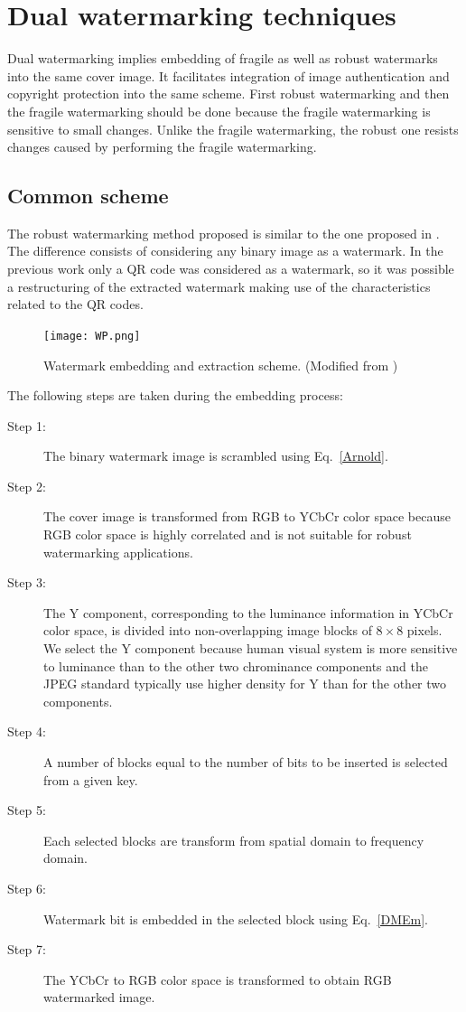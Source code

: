 \documentclass[runningheads]{llncs}
\begin{document}
\section{Dual watermarking techniques}
Dual watermarking implies embedding of fragile as well as robust watermarks into the same cover image. It facilitates integration of image authentication and copyright protection into the same scheme. First robust watermarking and then the fragile watermarking should be done because the fragile watermarking is sensitive to small changes. Unlike the fragile watermarking, the robust one resists changes caused by performing the fragile watermarking.

\subsection{Common scheme}
The robust watermarking method proposed is similar to the one proposed in \cite{avila2018watermarking}. The difference consists of considering any binary image as a watermark. In the previous work only a QR code was considered as a watermark, so it was possible a restructuring of the extracted watermark making use of the characteristics related to the QR codes.
\begin{figure}
	\begin{center}
		\texttt{[image: WP.png]}
	\end{center}
	\caption{Watermark embedding and extraction scheme. (Modified from \cite{avila2018watermarking})}
	\label{PIE}
\end{figure}

The following steps are taken during the embedding process:
\begin{description}
	\item[Step 1:] The binary watermark image is scrambled using Eq.~\ref{Arnold}.
	\item[Step 2:] The cover image is transformed from RGB to YCbCr color space because RGB color space is highly correlated and is not suitable for robust watermarking applications.
	\item[Step 3:] The Y component, corresponding to the luminance information in YCbCr color space, is divided into non-overlapping image blocks of $8\times 8$ pixels. We select the Y component because human visual system is more sensitive to luminance than to the other two chrominance components and the JPEG standard typically use higher density for Y than for the other two components.
	\item[Step 4:] A number of blocks equal to the number of bits to be inserted is selected from a given key.
	\item[Step 5:] Each selected blocks are transform from spatial domain to frequency domain.
	\item[Step 6:] Watermark bit is embedded in the selected block using Eq.~\ref{DMEm}.
	\item[Step 7:] The YCbCr to RGB color space is transformed to obtain RGB watermarked image.
\end{description}
\end{document}
